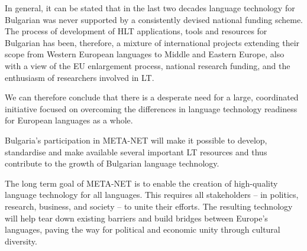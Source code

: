 \begin{multicols}{2}
  In general, it can be stated that in the last two decades language technology for Bulgarian was never supported by a consistently devised national funding scheme. The process of development of HLT applications, tools and resources for Bulgarian has been, therefore, a mixture of international projects extending their scope from Western European languages to Middle and Eastern Europe, also with a view of the EU enlargement process, national research funding, and the enthusiasm of researchers involved in LT.
  \columnbreak

  We can therefore conclude that there is a desperate need for a large, coordinated initiative focused on overcoming the differences in language technology readiness for European languages as a whole. 

  Bulgaria’s participation in
  META-NET will make it possible to develop, standardise and make
  available several important LT resources and thus contribute to the
  growth of Bulgarian language technology.

  The long term goal of META-NET is to enable the creation of high-quality language technology for all languages. This requires all stakeholders -- in politics, research, business, and society -- to unite their efforts. The resulting technology will help tear down existing barriers and build bridges between Europe’s languages, paving the way for political and economic unity through cultural diversity. 
  \end{multicols}

  \clearpage

